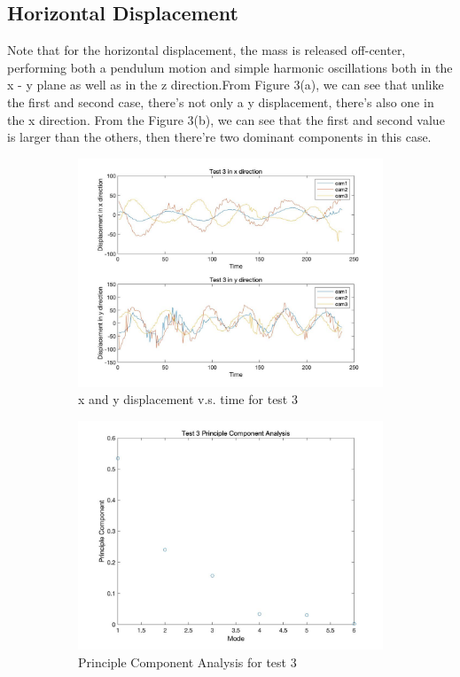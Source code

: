\documentclass[12pt,letterpaper]{article}
\begin{document}
\subsection*{Horizontal Displacement}
Note that for the horizontal displacement, the mass is released off-center, performing both a pendulum motion and simple harmonic oscillations both in the x - y plane as well as in the z direction.From Figure 3(a), we can see that unlike the first and second case, there's not only a y displacement, there's also one in the x direction.  From the Figure 3(b), we can see that the first and second value is larger than the others, then there're two dominant components in this case. 
\begin{figure}[ht]
\begin{subfigure}{.5\textwidth}
  \centering
  \includegraphics[width=0.9\linewidth]{3-a.jpg}  
  \caption{x and y displacement v.s. time for test 3}
  \label{fig:sub-first}
\end{subfigure}
\begin{subfigure}{.5\textwidth}
  \centering
  \includegraphics[width=0.9\linewidth]{3-b.jpg}  
  \caption{Principle Component Analysis for test 3}
  \label{fig:sub-second}
\end{subfigure}
\label{fig:fig}
\caption{}
\end{figure}
\end{document}
